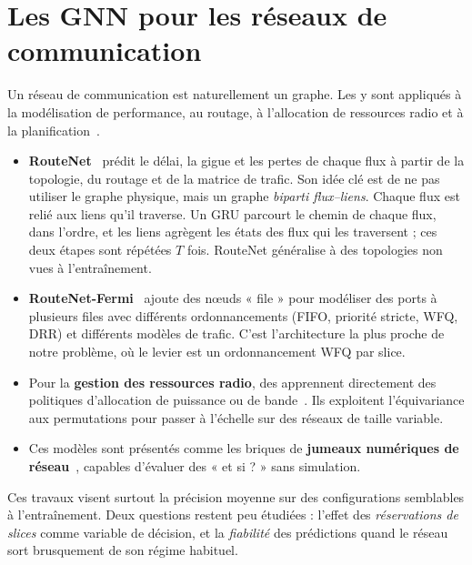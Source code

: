 \section{Les GNN pour les réseaux de communication}\label{sec:sota-gnnnet}
Un réseau de communication est naturellement un graphe. Les \gnn{} y sont appliqués à la modélisation de performance, au routage, à l'allocation de ressources radio et à la planification~\cite{suarez,jiang}.
\begin{itemize}
  \item \textbf{RouteNet}~\cite{routenet} prédit le délai, la gigue et les pertes de chaque flux à partir de la topologie, du routage et de la matrice de trafic. Son idée clé est de ne pas utiliser le graphe physique, mais un graphe \emph{biparti flux--liens}. Chaque flux est relié aux liens qu'il traverse. Un GRU parcourt le chemin de chaque flux, dans l'ordre, et les liens agrègent les états des flux qui les traversent ; ces deux étapes sont répétées $T$ fois. RouteNet généralise à des topologies non vues à l'entraînement.
  \item \textbf{RouteNet-Fermi}~\cite{routenetf} ajoute des nœuds « file » pour modéliser des ports à plusieurs files avec différents ordonnancements (FIFO, priorité stricte, WFQ, DRR) et différents modèles de trafic. C'est l'architecture la plus proche de notre problème, où le levier est un ordonnancement WFQ par slice.
  \item Pour la \textbf{gestion des ressources radio}, des \gnn{} apprennent directement des politiques d'allocation de puissance ou de bande~\cite{eisen,shen}. Ils exploitent l'équivariance aux permutations pour passer à l'échelle sur des réseaux de taille variable.
  \item Ces modèles sont présentés comme les briques de \textbf{jumeaux numériques de réseau}~\cite{digitaltwin}, capables d'évaluer des « et si ? » sans simulation.
\end{itemize}
Ces travaux visent surtout la précision moyenne sur des configurations semblables à l'entraînement. Deux questions restent peu étudiées : l'effet des \emph{réservations de slices} comme variable de décision, et la \emph{fiabilité} des prédictions quand le réseau sort brusquement de son régime habituel.

